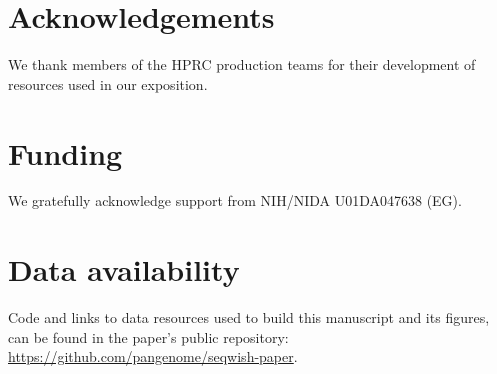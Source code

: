\documentclass{bioinfo}
\begin{document}
    \section*{Acknowledgements}

    We thank members of the HPRC production teams for their development of resources used in our exposition.

    \section*{Funding}

    We gratefully acknowledge support from NIH/NIDA U01DA047638 (EG).

    \section*{Data availability}

    Code and links to data resources used to build this manuscript and its figures, can be found in the paper's public repository: \url{https://github.com/pangenome/seqwish-paper}.

    

    
\end{document}
